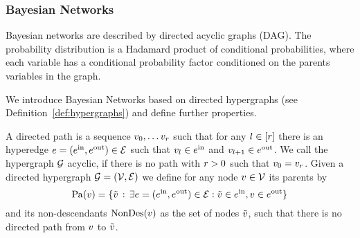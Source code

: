 
\subsubsection{Bayesian Networks}

Bayesian networks are described by directed acyclic graphs (DAG).
The probability distribution is a Hadamard product of conditional probabilities, where each variable has a conditional probability factor conditioned on the parents variables in the graph.

We introduce Bayesian Networks based on directed hypergraphs (see Definition~\ref{def:hypergraphs}) and define further properties.

\begin{definition}
	A directed path is a sequence $v_{0},\ldots v_{r}$ such that for any $l\in[r]$ there is an hyperedge $e=(e^{\mathrm{in}},e^{\mathrm{out}})\in\mathcal{E}$ such that $v_{l}\in e^{\mathrm{in}}$ and $v_{l+1}\in e^{\mathrm{out}}$.
	We call the hypergraph $\mathcal{G}$ acyclic, if there is no path with $r>0$ such that $v_{0}=v_{r}$.
	Given a directed hypergraph $\mathcal{G}=(\mathcal{V},\mathcal{E})$ we define for any node $v\in\mathcal{V}$ its parents by
		\[ \mathrm{Pa}(v) = \{\tilde{v} \, : \, \exists e=(e^{\mathrm{in}},e^{\mathrm{out}})\in\mathcal{E}: \tilde{v}\in e^{\mathrm{in}},v\in e^{\mathrm{out}} \} \]
	and its non-descendants $\mathrm{NonDes}(v)$ as the set of nodes $\tilde{v}$, such that there is no directed path from $v$ to $\tilde{v}$.
\end{definition}

